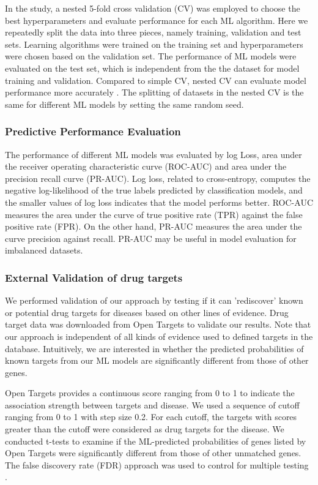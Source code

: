       In the study, a nested 5-fold cross validation (CV) was employed to choose the best hyperparameters and evaluate performance for each ML algorithm. Here we repeatedly split the data into three pieces, namely training, validation and test sets. Learning algorithms were trained on the training set and hyperparameters were chosen based on the validation set. The performance of ML models were evaluated on the test set, which is independent from the the dataset for model training and validation. Compared to simple CV, nested CV can evaluate model performance more accurately \cite{varma2006bias}. The splitting of datasets in the nested CV is the same for different ML models by setting the same random seed. 
  
    \subsubsection{Predictive Performance Evaluation}
      The performance of different ML models was evaluated by log Loss, area under the receiver operating characteristic curve (ROC-AUC) and area under the precision recall curve (PR-AUC). Log loss, related to cross-entropy, computes the negative log-likelihood of the true labels predicted by classification models, and the smaller values of log loss indicates that the model performs better. ROC-AUC measures the area under the curve of true positive rate (TPR) against the false positive rate (FPR). On the other hand, PR-AUC measures the area under the curve  precision against recall. PR-AUC may be useful in model evaluation for  imbalanced datasets\cite{davis2006relationship}. 
  
    \subsubsection{External Validation of drug targets}
      We performed validation of our approach by testing if it can 'rediscover' known or potential drug targets for diseases based on other lines of evidence. Drug target data was downloaded from Open Targets \cite{koscielny2017open} to validate our results. Note that our approach is independent of all kinds of evidence used to defined targets in the database. Intuitively, we are interested in whether the predicted probabilities of known targets from our ML models are significantly different from those of other genes.

      Open Targets provides a continuous score ranging from 0 to 1 to indicate the association strength between targets and disease. We used a sequence of cutoff ranging from 0 to 1 with step size 0.2. For each cutoff, the targets with scores greater than the cutoff were considered as drug targets for the disease. We conducted t-tests to examine if the ML-predicted probabilities of genes listed by Open Targets were significantly different from those of other unmatched genes. The false discovery rate (FDR) approach was used to control for multiple testing \cite{benjamini1995controlling}.
  
